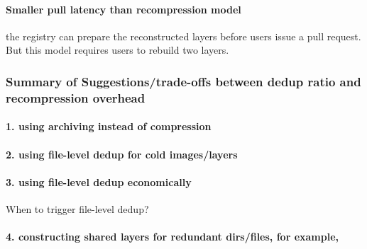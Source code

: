 \paragraph{Smaller pull latency than recompression model} the registry can prepare the reconstructed layers before users issue a pull request. But this model requires users to rebuild two layers.

\subsubsection{Summary of Suggestions/trade-offs between dedup ratio and recompression overhead}

\paragraph{1. using archiving instead of compression}
\paragraph{2. using file-level dedup for cold images/layers}
\paragraph{3. using file-level dedup economically}
When to trigger file-level dedup?
\paragraph{4. constructing shared layers for redundant dirs/files, for example,}

